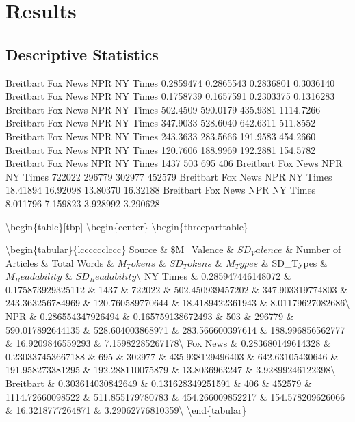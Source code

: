 \documentclass[english,,man]{apa6}
\begin{document}
\hypertarget{results}{%
\section{Results}\label{results}}

\hypertarget{descriptive-statistics}{%
\subsection{Descriptive Statistics}\label{descriptive-statistics}}

Breitbart Fox News NPR NY Times
0.2859474 0.2865543 0.2836801 0.3036140
Breitbart Fox News NPR NY Times
0.1758739 0.1657591 0.2303375 0.1316283
Breitbart Fox News NPR NY Times
502.4509 590.0179 435.9381 1114.7266
Breitbart Fox News NPR NY Times
347.9033 528.6040 642.6311 511.8552
Breitbart Fox News NPR NY Times
243.3633 283.5666 191.9583 454.2660
Breitbart Fox News NPR NY Times
120.7606 188.9969 192.2881 154.5782
Breitbart Fox News NPR NY Times
1437 503 695 406
Breitbart Fox News NPR NY Times
722022 296779 302977 452579
Breitbart Fox News NPR NY Times
18.41894 16.92098 13.80370 16.32188
Breitbart Fox News NPR NY Times
8.011796 7.159823 3.928992 3.290628

\textbackslash{}begin\{table\}{[}tbp{]}
\textbackslash{}begin\{center\}
\textbackslash{}begin\{threeparttable\}

\caption{\label{tab:exp1sourcedescriptives}}

\textbackslash{}begin\{tabular\}\{lcccccclccc\}
\toprule
Source \& \$M\_Valence \& \(SD_Valence\) \& Number of Articles \& Total Words \& \(M_Tokens\) \& \(SD_Tokens\) \& \(M_Types\) \& SD\_Types \& \(M_Readability\) \& \(SD_Readability\)\textbackslash{}
\midrule
NY Times \& 0.285947446148072 \& 0.175873929325112 \& 1437 \& 722022 \& 502.450939457202 \& 347.903319774803 \& 243.363256784969 \& 120.760589770644 \& 18.4189422361943 \& 8.01179627082686\textbackslash{}
NPR \& 0.286554347926494 \& 0.165759138672493 \& 503 \& 296779 \& 590.017892644135 \& 528.604003868971 \& 283.566600397614 \& 188.996856562777 \& 16.9209846559293 \& 7.15982285267178\textbackslash{}
Fox News \& 0.283680149614328 \& 0.230337453667188 \& 695 \& 302977 \& 435.938129496403 \& 642.63105430646 \& 191.958273381295 \& 192.288110075879 \& 13.8036963247 \& 3.92899246122398\textbackslash{}
Breitbart \& 0.303614030842649 \& 0.131628349251591 \& 406 \& 452579 \& 1114.72660098522 \& 511.855179780783 \& 454.266009852217 \& 154.578209626066 \& 16.3218777264871 \& 3.29062776810359\textbackslash{}
\bottomrule
\addlinespace
\textbackslash{}end\{tabular\}
\end{document}
